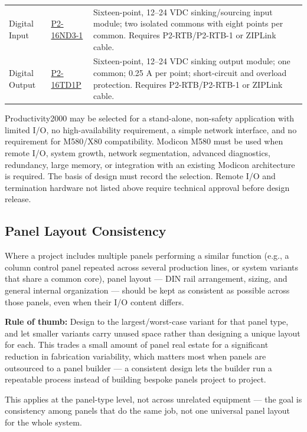\begin{longtable}{@{}p{2cm}p{2cm}p{8cm}@{}}
Digital Input & \href{https://www.automationdirect.com/adc/shopping/catalog/programmable_controllers/productivity2000_plcs_\%28micro-modular\%29/dc_i-z-o/p2-16nd3-1}{P2-16ND3-1} & Sixteen-point, 12--24 VDC sinking/sourcing input module; two isolated commons with eight points per common. Requires P2-RTB/P2-RTB-1 or ZIPLink cable. \\
Digital Output & \href{https://www.automationdirect.com/adc/shopping/catalog/programmable_controllers/productivity2000_plcs_\%28micro-modular\%29/dc_i-z-o/p2-16td1p}{P2-16TD1P} & Sixteen-point, 12--24 VDC sinking output module; one common; 0.25 A per point; short-circuit and overload protection. Requires P2-RTB/P2-RTB-1 or ZIPLink cable. \\
\bottomrule
\end{longtable}
Productivity2000 may be selected for a stand-alone, non-safety application with limited I/O, no high-availability requirement, a simple network interface, and no requirement for M580/X80 compatibility. Modicon M580 must be used when remote I/O, system growth, network segmentation, advanced diagnostics, redundancy, large memory, or integration with an existing Modicon architecture is required. The basis of design must record the selection. Remote I/O and termination hardware not listed above require technical approval before design release.

\subsection{Panel Layout Consistency}
Where a project includes multiple panels performing a similar function (e.g., a column control panel repeated across several production lines, or system variants that share a common core), panel layout --- DIN rail arrangement, sizing, and general internal organization --- should be kept as consistent as possible across those panels, even when their I/O content differs.

\textbf{Rule of thumb:} Design to the largest/worst-case variant for that panel type, and let smaller variants carry unused space rather than designing a unique layout for each. This trades a small amount of panel real estate for a significant reduction in fabrication variability, which matters most when panels are outsourced to a panel builder --- a consistent design lets the builder run a repeatable process instead of building bespoke panels project to project.

This applies at the panel-type level, not across unrelated equipment --- the goal is consistency among panels that do the same job, not one universal panel layout for the whole system.

